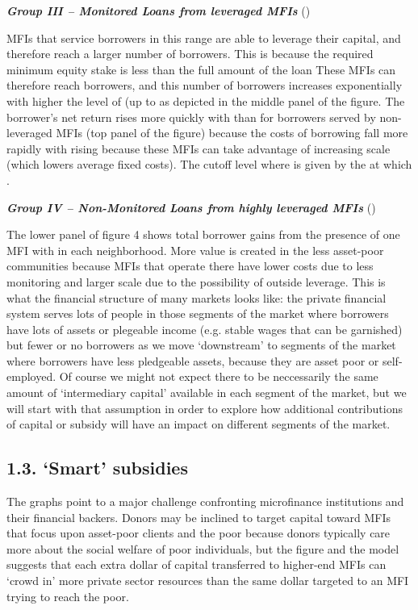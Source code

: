 \documentclass{article}
\begin{document}
\emph{\textbf{\emph{Group III -- Monitored Loans from leveraged MFIs}}}
()

MFIs that service borrowers in this range are able to leverage their
capital, and therefore reach a larger number of borrowers. This is
because the required minimum equity stake is less than the full amount
of the loan These MFIs can therefore reach borrowers, and this number of
borrowers increases exponentially with higher the level of (up to as
depicted in the middle panel of the figure. The borrower's net return
rises more quickly with than for borrowers served by non-leveraged MFIs
(top panel of the figure) because the costs of borrowing fall more
rapidly with rising because these MFIs can take advantage of increasing
scale (which lowers average fixed costs). The cutoff level where is
given by the at which .

\emph{\textbf{\emph{Group IV -- Non-Monitored Loans from highly
leveraged MFIs}}} ()

The lower panel of figure 4 shows total borrower gains from the presence
of one MFI with in each neighborhood. More value is created in the less
asset-poor communities because MFIs that operate there have lower costs
due to less monitoring and larger scale due to the possibility of
outside leverage. This is what the financial structure of many markets
looks like: the private financial system serves lots of people in those
segments of the market where borrowers have lots of assets or plegeable
income (e.g. stable wages that can be garnished) but fewer or no
borrowers as we move `downstream' to segments of the market where
borrowers have less pledgeable assets, because they are asset poor or
self-employed. Of course we might not expect there to be neccessarily
the same amount of `intermediary capital' available in each segment of
the market, but we will start with that assumption in order to explore
how additional contributions of capital or subsidy will have an impact
on different segments of the market.

\subsection{1.3. `Smart' subsidies}\label{smart-subsidies}

The graphs point to a major challenge confronting microfinance
institutions and their financial backers. Donors may be inclined to
target capital toward MFIs that focus upon asset-poor clients and the
poor because donors typically care more about the social welfare of poor
individuals, but the figure and the model suggests that each extra
dollar of capital transferred to higher-end MFIs can `crowd in' more
private sector resources than the same dollar targeted to an MFI trying
to reach the poor.
\end{document}
